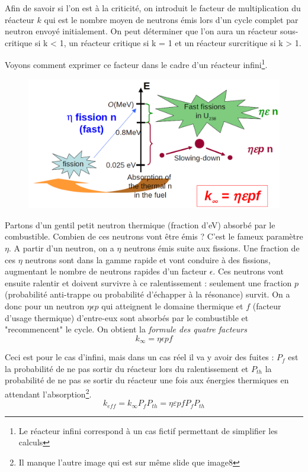 \newpage
Afin de savoir si l'on est à la criticité, on introduit le facteur de multiplication du réacteur $k$ qui est 
le nombre moyen de neutrons émis lors d'un cycle complet par neutron envoyé initialement. 
On peut déterminer que l'on aura un réacteur sous-critique si k < 1, un réacteur critique si k = 1 et
un réacteur surcritique si k > 1.

Voyons comment exprimer ce facteur dans le cadre d'un réacteur infini\footnote{Le réacteur infini correspond
à un cas fictif permettant de simplifier les calculs}. \\

	\begin{figure}
	\vspace{-5mm}
	\includegraphics[scale=0.27]{ch1/image7.png}
	\end{figure}
	
Partons d'un gentil petit neutron thermique (fraction d'eV) absorbé par le combustible. Combien 
de ces neutrons vont être émis ? C'est le fameux paramètre $\eta$. A partir d'un neutron, on a 
$\eta$ neutrons émis suite aux fissions. Une fraction de ces $\eta$ neutrons sont dans 
la gamme rapide et vont conduire à des fissions, augmentant le nombre de neutrons rapides d'un facteur $\epsilon$. Ces
neutrons vont ensuite ralentir et doivent survivre à ce ralentissement : seulement une fraction 
$p$ (probabilité anti-trappe ou probabilité d'échapper à la résonance) survit. On a donc pour un neutron $\eta\epsilon p$ qui atteignent 
le domaine thermique et $f$ (facteur d'usage thermique) d'entre-eux sont absorbés par le combustible et "recommencent" le cycle. 
On obtient la \textit{formule des quatre facteurs}
\begin{equation}
k_\infty = \eta\epsilon  pf
\end{equation}

Ceci est pour le cas d'infini, mais dans un cas réel il va y avoir des fuites : $P_f$ est la 
probabilité de ne pas sortir du réacteur lors du ralentissement et $P_{th}$ la probabilité de ne pas se sortir
du réacteur une fois aux énergies thermiques en attendant l'absorption\footnote{Il manque l'autre image qui est sur
même slide que image8}. 
\begin{equation}
k_{eff} = k_\infty P_fP_{th} = \eta \varepsilon pfP_fP_{th}
\end{equation}

